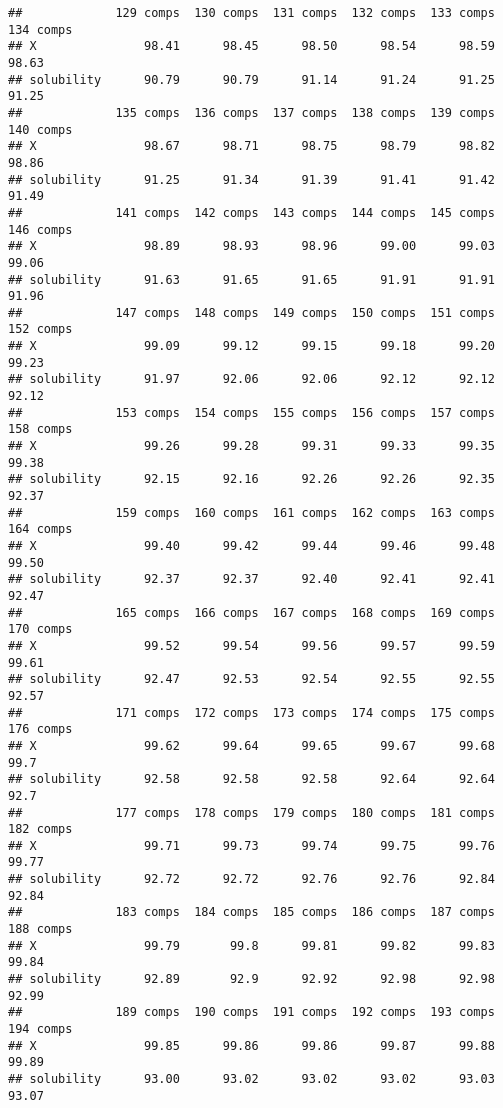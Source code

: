 \documentclass[
]{article}
\begin{document}
\begin{verbatim}
##             129 comps  130 comps  131 comps  132 comps  133 comps  134 comps
## X               98.41      98.45      98.50      98.54      98.59      98.63
## solubility      90.79      90.79      91.14      91.24      91.25      91.25
##             135 comps  136 comps  137 comps  138 comps  139 comps  140 comps
## X               98.67      98.71      98.75      98.79      98.82      98.86
## solubility      91.25      91.34      91.39      91.41      91.42      91.49
##             141 comps  142 comps  143 comps  144 comps  145 comps  146 comps
## X               98.89      98.93      98.96      99.00      99.03      99.06
## solubility      91.63      91.65      91.65      91.91      91.91      91.96
##             147 comps  148 comps  149 comps  150 comps  151 comps  152 comps
## X               99.09      99.12      99.15      99.18      99.20      99.23
## solubility      91.97      92.06      92.06      92.12      92.12      92.12
##             153 comps  154 comps  155 comps  156 comps  157 comps  158 comps
## X               99.26      99.28      99.31      99.33      99.35      99.38
## solubility      92.15      92.16      92.26      92.26      92.35      92.37
##             159 comps  160 comps  161 comps  162 comps  163 comps  164 comps
## X               99.40      99.42      99.44      99.46      99.48      99.50
## solubility      92.37      92.37      92.40      92.41      92.41      92.47
##             165 comps  166 comps  167 comps  168 comps  169 comps  170 comps
## X               99.52      99.54      99.56      99.57      99.59      99.61
## solubility      92.47      92.53      92.54      92.55      92.55      92.57
##             171 comps  172 comps  173 comps  174 comps  175 comps  176 comps
## X               99.62      99.64      99.65      99.67      99.68       99.7
## solubility      92.58      92.58      92.58      92.64      92.64       92.7
##             177 comps  178 comps  179 comps  180 comps  181 comps  182 comps
## X               99.71      99.73      99.74      99.75      99.76      99.77
## solubility      92.72      92.72      92.76      92.76      92.84      92.84
##             183 comps  184 comps  185 comps  186 comps  187 comps  188 comps
## X               99.79       99.8      99.81      99.82      99.83      99.84
## solubility      92.89       92.9      92.92      92.98      92.98      92.99
##             189 comps  190 comps  191 comps  192 comps  193 comps  194 comps
## X               99.85      99.86      99.86      99.87      99.88      99.89
## solubility      93.00      93.02      93.02      93.02      93.03      93.07

\end{verbatim}
\end{document}
